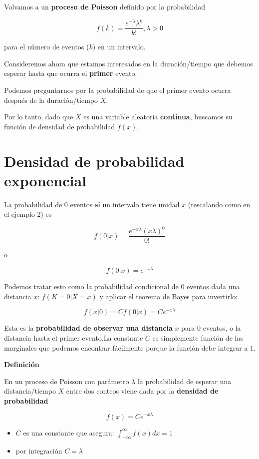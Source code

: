 \documentclass[
]{book}
\begin{document}
Volvamos a un \textbf{proceso de Poisson} definido por la probabilidad

\[f(k)=\frac{e^{-\lambda}\lambda^k}{k!}, \lambda>0\]

para el número de eventos (\(k\)) en un intervalo.

Consideremos ahora que estamos interesados en la duración/tiempo que debemos esperar hasta que ocurra el \textbf{primer} evento.

Podemos preguntarnos por la probabilidad de que el primer evento ocurra después de la duración/tiempo \(X\).

Por lo tanto, dado que \(X\) es una variable aleatoria \textbf{continua}, buscamos su función de densidad de probabilidad \(f(x)\).

\hypertarget{densidad-de-probabilidad-exponencial}{%
\section{Densidad de probabilidad exponencial}\label{densidad-de-probabilidad-exponencial}}

La probabilidad de \(0\) eventos \textbf{si} un intervalo tiene unidad \(x\) (rescalando como en el ejemplo 2) es

\[f(0|x)=\frac{e^{-x\lambda}(x\lambda)^0}{0!}\]

o

\[f(0|x)=e^{-x\lambda}\]

Podemos tratar esto como la probabilidad condicional de \(0\) eventos dada una distancia \(x\): \(f(K=0|X=x)\) y aplicar el teorema de Bayes para invertirlo:

\[f(x|0)=C f(0|x)=C e^{-x\lambda}\]

Esta es la \textbf{probabilidad de observar una distancia} \(x\) para \(0\) eventos, o la distancia hasta el primer evento.La constante \(C\) es simplemente función de las marginales que podemos encontrar fácilmente porque la función debe integrar a 1.

\textbf{Definición}

En un proceso de Poisson con parámetro \(\lambda\) la probabilidad de esperar una distancia/tiempo \(X\) entre dos conteos viene dada por la \textbf{densidad de probabilidad}

\[f(x)= C e^{-x\lambda}\]

\begin{itemize}
\item
  \(C\) es una constante que asegura: \(\int_{-\infty}^{\infty} f(x) dx =1\)
\item
  por integración \(C=\lambda\)
\end{itemize}
\end{document}

